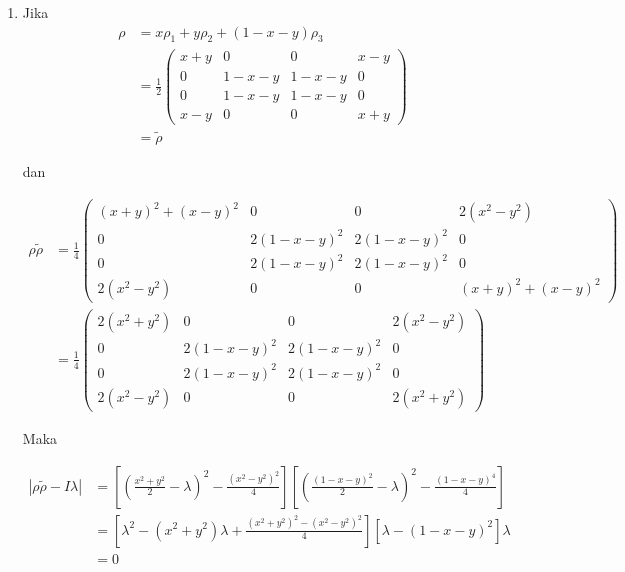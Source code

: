 \begin{enumerate}
	sehingga $\lambda_1=x^2$, $\lambda_2=(1-x)^2$, dan $\lambda_3=\lambda_4=0$.
	
	\item Jika
	\begin{equation}
		\begin{aligned}
			\rho
			&=x\rho_1+y\rho_2+(1-x-y)\rho_3\\
			&=\frac{1}{2}
			\begin{pmatrix}
				x+y&0&0&x-y\\
				0&1-x-y&1-x-y&0\\
				0&1-x-y&1-x-y&0\\
				x-y&0&0&x+y
			\end{pmatrix}\\
			&=\tilde{\rho}
		\end{aligned}
	\end{equation}
	
	dan
	
	\begin{equation}
		\begin{aligned}
			\rho \tilde{\rho}
			&=\frac{1}{4}
			\begin{pmatrix}
				(x+y)^2+(x-y)^2&0&0&2(x^2-y^2)\\
				0&2(1-x-y)^2&2(1-x-y)^2&0\\
				0&2(1-x-y)^2&2(1-x-y)^2&0\\
				2(x^2-y^2)&0&0&(x+y)^2+(x-y)^2
			\end{pmatrix}\\
			&=\frac{1}{4}
			\begin{pmatrix}
				2(x^2+y^2)&0&0&2(x^2-y^2)\\
				0&2(1-x-y)^2&2(1-x-y)^2&0\\
				0&2(1-x-y)^2&2(1-x-y)^2&0\\
				2(x^2-y^2)&0&0&2(x^2+y^2)
			\end{pmatrix}
		\end{aligned}
	\end{equation}
	
	Maka
	
	\begin{equation}
		\begin{aligned}
			|\rho \tilde{\rho}-I\lambda|
			&=[(\frac{x^2+y^2}{2}-\lambda)^2-\frac{(x^2-y^2)^2}{4}][(\frac{(1-x-y)^2}{2}-\lambda)^2-\frac{(1-x-y)^4}{4}]\\
			&=[\lambda^2-(x^2+y^2)\lambda+\frac{(x^2+y^2)^2-(x^2-y^2)^2}{4}][\lambda-(1-x-y)^2]\lambda\\
			&=0
		\end{aligned}
	\end{equation}
	

\end{enumerate}
